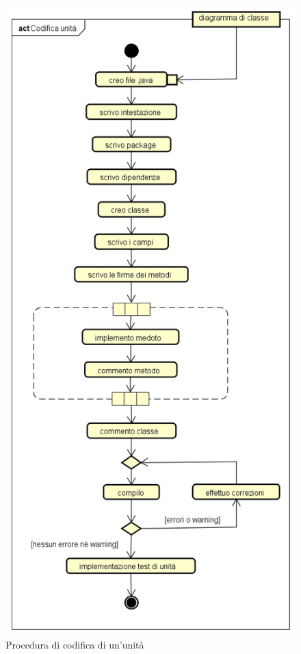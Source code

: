 			\begin{figure}[!ht]
				\centering
				\includegraphics[scale=0.5]{./img/codifica_unita.png}
				\caption[Procedura di codifica di un'unità]{Procedura di codifica di un'unità}
			\end{figure}\\

